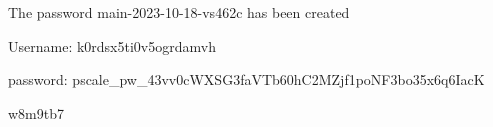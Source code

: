 The password main-2023-10-18-vs462c has been created

Username: k0rdsx5ti0v5ogrdamvh

password: pscale_pw_43vv0cWXSG3faVTb60hC2MZjf1poNF3bo35x6q6IacK




w8m9tb7